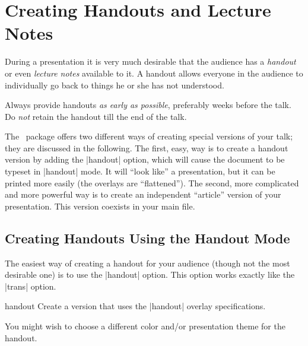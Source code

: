 %
%
%

\section{Creating Handouts and Lecture Notes}
\label{section-modes}

During a presentation it is very much desirable that the audience has a \emph{handout} or even \emph{lecture notes} available to it. A handout allows everyone in the audience to individually go back to things he or she has not understood.

Always provide handouts \emph{as early as possible}, preferably weeks before the talk. Do \emph{not} retain the handout till the end of the talk.

The \beamer\ package offers two different ways of creating special versions of your talk; they are discussed in the following. The first, easy, way is to create a handout version by adding the |handout| option, which will cause the document to be typeset in |handout| mode. It will ``look like'' a presentation, but it can be printed more easily (the overlays are ``flattened''). The second, more complicated and more powerful way is to create an independent ``article'' version of your presentation. This version coexists in your main file.


\subsection{Creating Handouts Using the Handout Mode}
\label{handout}

The easiest way of creating a handout for your audience (though not the most desirable one) is to use the |handout| option. This option works exactly like the |trans| option. 

\begin{classoption}{handout}
  Create a version that uses the |handout| overlay specifications.

  You might wish to choose a different color and/or presentation theme for the handout.
\end{classoption}

